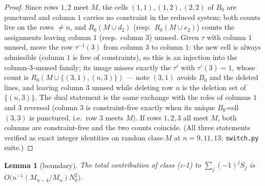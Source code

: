 \documentclass[11pt]{article}
\newtheorem{lemma}[theorem]{Lemma}
\theoremstyle{definition}
\begin{document}
\begin{proof}
Since rows $1,2$ meet $M$, the cells $(1,1),(1,2),(2,2)$ of $B_0$ are
punctured and column $1$ carries no constraint in the reduced system;
both counts live on the rows $\ne n$, and $R_0(M\cup d_2)$
(resp.\ $R_0(M\cup e_2)$) counts the assignments leaving column $1$
(resp.\ column $3$) unused.  Given $\tau$ with column $1$ unused, move
the row $\tau^{-1}(3)$ from column $3$ to column $1$: the new cell is
always admissible (column $1$ is free of constraints), so this is an
injection into the column-$3$-unused family; its image misses exactly
the $\tau'$ with $\tau'(3)=1$, whose count is
$R_0(M\cup\{(3,1),(n,3)\})$ --- note $(3,1)$ avoids $B_0$ and the
deleted lines, and leaving column $3$ unused while deleting row $n$ is
the deletion set of $\{(n,3)\}$.  The dual statement is the same
exchange with the roles of columns $1$ and $3$ reversed (column $3$ is
constraint-free exactly when its unique $B_0$-cell $(3,3)$ is punctured,
i.e.\ row $3$ meets $M$).  If rows $1,2,3$ all meet $M$, both columns
are constraint-free and the two counts coincide.  (All three statements
verified as exact integer identities on random class-$M$ at $n=9,11,13$;
\texttt{switch.py} suite.)
\end{proof}

\begin{lemma}[boundary]\label{lem:boundary}
The total contribution of class \textup{(c-1)} to $\sum_j(-1)^jS_j$ is
$O\bigl(n^{-1}(M_{n-4}/M_n)N_0^2\bigr)$.
\end{lemma}
\end{document}
